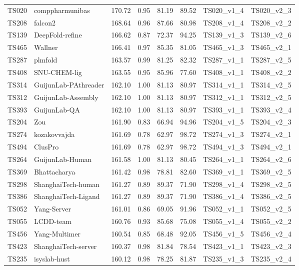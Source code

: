 \begin{longtable}{llllllll}
TS020 & comppharmunibas & 170.72 & 0.95 & 81.19 & 89.52 & TS020\_v1\_4 & TS020\_v2\_3 \\ 
TS208 & falcon2 & 168.64 & 0.96 & 87.66 & 80.98 & TS208\_v1\_4 & TS208\_v2\_2 \\ 
TS139 & DeepFold-refine & 166.62 & 0.87 & 72.37 & 94.25 & TS139\_v1\_3 & TS139\_v2\_6 \\ 
TS465 & Wallner & 166.41 & 0.97 & 85.35 & 81.05 & TS465\_v1\_3 & TS465\_v2\_1 \\ 
TS287 & plmfold & 163.57 & 0.99 & 81.25 & 82.32 & TS287\_v1\_1 & TS287\_v2\_5 \\ 
TS408 & SNU-CHEM-lig & 163.55 & 0.95 & 85.96 & 77.60 & TS408\_v1\_1 & TS408\_v2\_2 \\ 
TS314 & GuijunLab-PAthreader & 162.10 & 1.00 & 81.13 & 80.97 & TS314\_v1\_1 & TS314\_v2\_5 \\ 
TS312 & GuijunLab-Assembly & 162.10 & 1.00 & 81.13 & 80.97 & TS312\_v1\_1 & TS312\_v2\_5 \\ 
TS393 & GuijunLab-QA & 162.10 & 1.00 & 81.13 & 80.97 & TS393\_v1\_1 & TS393\_v2\_4 \\ 
TS204 & Zou & 161.90 & 0.83 & 66.94 & 94.96 & TS204\_v1\_5 & TS204\_v2\_3 \\ 
TS274 & kozakovvajda & 161.69 & 0.78 & 62.97 & 98.72 & TS274\_v1\_3 & TS274\_v2\_1 \\ 
TS494 & ClusPro & 161.69 & 0.78 & 62.97 & 98.72 & TS494\_v1\_3 & TS494\_v2\_1 \\ 
TS264 & GuijunLab-Human & 161.58 & 1.00 & 81.13 & 80.45 & TS264\_v1\_1 & TS264\_v2\_6 \\ 
TS369 & Bhattacharya & 161.42 & 0.98 & 78.81 & 82.60 & TS369\_v1\_1 & TS369\_v2\_5 \\ 
TS298 & ShanghaiTech-human & 161.27 & 0.89 & 89.37 & 71.90 & TS298\_v1\_4 & TS298\_v2\_5 \\ 
TS386 & ShanghaiTech-Ligand & 161.27 & 0.89 & 89.37 & 71.90 & TS386\_v1\_4 & TS386\_v2\_5 \\ 
TS052 & Yang-Server & 161.01 & 0.86 & 69.05 & 91.96 & TS052\_v1\_1 & TS052\_v2\_5 \\ 
TS055 & LCDD-team & 160.76 & 0.93 & 85.68 & 75.08 & TS055\_v1\_4 & TS055\_v2\_2 \\ 
TS456 & Yang-Multimer & 160.54 & 0.85 & 68.48 & 92.05 & TS456\_v1\_5 & TS456\_v2\_4 \\ 
TS423 & ShanghaiTech-server & 160.37 & 0.98 & 81.84 & 78.54 & TS423\_v1\_1 & TS423\_v2\_3 \\ 
TS235 & isyslab-hust & 160.12 & 0.98 & 78.25 & 81.87 & TS235\_v1\_3 & TS235\_v2\_4 \\ 

\end{longtable}
